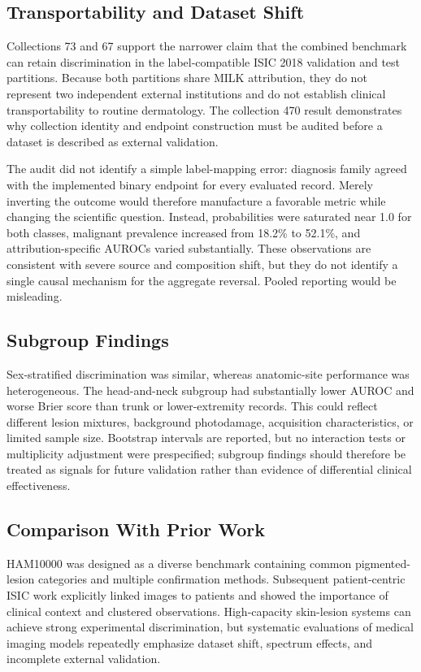 \documentclass[11pt]{article}
\begin{document}
\subsection{Transportability and Dataset Shift}
Collections 73 and 67 support the narrower claim that the combined benchmark can retain discrimination in the label-compatible ISIC 2018 validation and test partitions. Because both partitions share MILK attribution, they do not represent two independent external institutions and do not establish clinical transportability to routine dermatology. The collection 470 result demonstrates why collection identity and endpoint construction must be audited before a dataset is described as external validation.

The audit did not identify a simple label-mapping error: diagnosis family agreed with the implemented binary endpoint for every evaluated record. Merely inverting the outcome would therefore manufacture a favorable metric while changing the scientific question. Instead, probabilities were saturated near 1.0 for both classes, malignant prevalence increased from 18.2\% to 52.1\%, and attribution-specific AUROCs varied substantially. These observations are consistent with severe source and composition shift, but they do not identify a single causal mechanism for the aggregate reversal. Pooled reporting would be misleading.

\subsection{Subgroup Findings}
Sex-stratified discrimination was similar, whereas anatomic-site performance was heterogeneous. The head-and-neck subgroup had substantially lower AUROC and worse Brier score than trunk or lower-extremity records. This could reflect different lesion mixtures, background photodamage, acquisition characteristics, or limited sample size. Bootstrap intervals are reported, but no interaction tests or multiplicity adjustment were prespecified; subgroup findings should therefore be treated as signals for future validation rather than evidence of differential clinical effectiveness.

\subsection{Comparison With Prior Work}
HAM10000 was designed as a diverse benchmark containing common pigmented-lesion categories and multiple confirmation methods.\cite{tschandl2018} Subsequent patient-centric ISIC work explicitly linked images to patients and showed the importance of clinical context and clustered observations.\cite{rotemberg2021} High-capacity skin-lesion systems can achieve strong experimental discrimination,\cite{esteva2017} but systematic evaluations of medical imaging models repeatedly emphasize dataset shift, spectrum effects, and incomplete external validation.\cite{liu2019,roberts2021}
\end{document}
